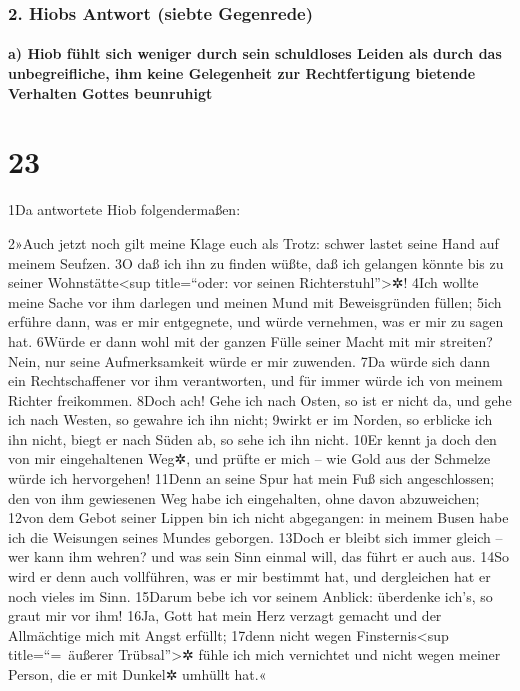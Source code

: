 \hypertarget{hiobs-antwort-siebte-gegenrede}{%
\subsubsection{2. Hiobs Antwort (siebte
Gegenrede)}\label{hiobs-antwort-siebte-gegenrede}}

\hypertarget{a-hiob-fuxfchlt-sich-weniger-durch-sein-schuldloses-leiden-als-durch-das-unbegreifliche-ihm-keine-gelegenheit-zur-rechtfertigung-bietende-verhalten-gottes-beunruhigt}{%
\paragraph{a) Hiob fühlt sich weniger durch sein schuldloses Leiden als
durch das unbegreifliche, ihm keine Gelegenheit zur Rechtfertigung
bietende Verhalten Gottes
beunruhigt}\label{a-hiob-fuxfchlt-sich-weniger-durch-sein-schuldloses-leiden-als-durch-das-unbegreifliche-ihm-keine-gelegenheit-zur-rechtfertigung-bietende-verhalten-gottes-beunruhigt}}

\hypertarget{section-22}{%
\section{23}\label{section-22}}

1Da antwortete Hiob folgendermaßen:

2»Auch jetzt noch gilt meine Klage euch als Trotz: schwer lastet seine
Hand auf meinem Seufzen. 3O daß ich ihn zu finden wüßte, daß ich
gelangen könnte bis zu seiner Wohnstätte\textless sup title=``oder: vor
seinen Richterstuhl''\textgreater✲! 4Ich wollte meine Sache vor ihm
darlegen und meinen Mund mit Beweisgründen füllen; 5ich erführe dann,
was er mir entgegnete, und würde vernehmen, was er mir zu sagen hat.
6Würde er dann wohl mit der ganzen Fülle seiner Macht mit mir streiten?
Nein, nur seine Aufmerksamkeit würde er mir zuwenden. 7Da würde sich
dann ein Rechtschaffener vor ihm verantworten, und für immer würde ich
von meinem Richter freikommen. 8Doch ach! Gehe ich nach Osten, so ist er
nicht da, und gehe ich nach Westen, so gewahre ich ihn nicht; 9wirkt er
im Norden, so erblicke ich ihn nicht, biegt er nach Süden ab, so sehe
ich ihn nicht. 10Er kennt ja doch den von mir eingehaltenen Weg✲, und
prüfte er mich -- wie Gold aus der Schmelze würde ich hervorgehen!
11Denn an seine Spur hat mein Fuß sich angeschlossen; den von ihm
gewiesenen Weg habe ich eingehalten, ohne davon abzuweichen; 12von dem
Gebot seiner Lippen bin ich nicht abgegangen: in meinem Busen habe ich
die Weisungen seines Mundes geborgen. 13Doch er bleibt sich immer gleich
-- wer kann ihm wehren? und was sein Sinn einmal will, das führt er auch
aus. 14So wird er denn auch vollführen, was er mir bestimmt hat, und
dergleichen hat er noch vieles im Sinn. 15Darum bebe ich vor seinem
Anblick: überdenke ich's, so graut mir vor ihm! 16Ja, Gott hat mein Herz
verzagt gemacht und der Allmächtige mich mit Angst erfüllt; 17denn nicht
wegen Finsternis\textless sup title=``=~äußerer Trübsal''\textgreater✲
fühle ich mich vernichtet und nicht wegen meiner Person, die er mit
Dunkel✲ umhüllt hat.«

